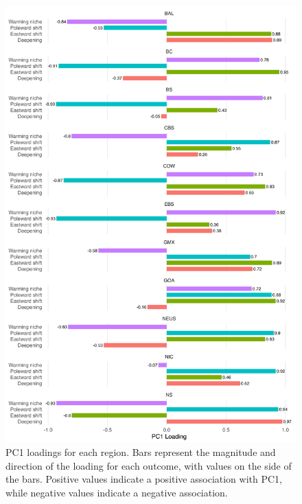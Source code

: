 \documentclass[11pt]{article}
\begin{document}
\newpage
\begin{figure}[h]
    \centering
        \includegraphics[scale=0.6]{output/figures/loadings.png}
    \caption{PC1 loadings for each region. Bars represent the magnitude and direction of the loading for each outcome, with values on the side of the bars. Positive values indicate a positive association with PC1, while negative values indicate a negative association.
}
    \label{fig:loadings}
\end{figure}

\clearpage
\end{document}
